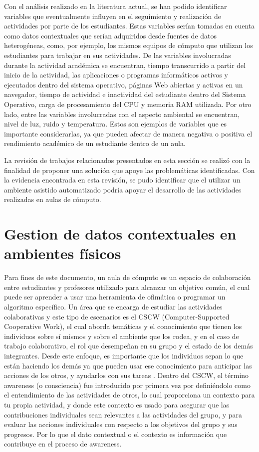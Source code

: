 Con el análisis realizado en la literatura actual, se han podido identificar variables que eventualmente influyen en el seguimiento y realización de actividades por parte de los estudiantes. Estas variables serían tomadas en cuenta como datos contextuales que serían adquiridos desde fuentes de datos heterogéneas, como, por ejemplo, los mismos equipos de cómputo que utilizan los estudiantes para trabajar en sus actividades. De las variables involucradas durante la actividad académica se encuentran, tiempo transcurrido a partir del inicio de la actividad, las aplicaciones o programas informáticos activos y ejecutados dentro del sistema operativo, páginas Web abiertas y activas en un navegador, tiempo de actividad e inactividad del estudiante dentro del Sistema Operativo, carga de procesamiento del CPU y memoria RAM utilizada. Por otro lado, entre las variables involucradas con el aspecto ambiental se encuentran, nivel de luz, ruido y temperatura. Estos son ejemplos de variables que es importante considerarlas, ya que pueden afectar de manera negativa o positiva el rendimiento académico de un estudiante dentro de un aula.

La revisión de trabajos relacionados presentados en esta sección se realizó con la finalidad de proponer una solución que apoye las problemáticas identificadas. Con la evidencia encontrada en esta revisión, se pudo identificar que el utilizar un ambiente asistido automatizado podría apoyar el desarrollo de las actividades realizadas en aulas de cómputo.


\section{Gestion de datos contextuales en ambientes físicos}
Para fines de este documento, un aula de cómputo es un espacio de colaboración entre estudiantes y profesores utilizado para alcanzar un objetivo común, el cual puede ser aprender a usar una herramienta de ofimática o programar un algoritmo específico. Un área que se encarga de estudiar las actividades colaborativas y este tipo de escenarios es el CSCW (Computer-Supported Cooperative Work), el cual aborda temáticas y el conocimiento que tienen los individuos sobre sí mismos y sobre el ambiente que los rodea, y en el caso de trabajo colaborativo, el rol que desempeñan en su grupo y el estado de los demás integrantes. Desde este enfoque, es importante que los individuos sepan lo que están haciendo los demás ya que pueden usar ese conocimiento para anticipar las acciones de los otros, y ayudarlos con sus tareas \citep{Gutwin1996}. Dentro del CSCW, el término awareness (o consciencia) fue introducido por primera vez por \citep{Dourish1992a} definiéndolo como el entendimiento de las actividades de otros, lo cual proporciona un contexto para tu propia actividad, y donde este contexto es usado para asegurar que las contribuciones individuales sean relevantes a las actividades del grupo, y para evaluar las acciones individuales con respecto a los objetivos del grupo y sus progresos. Por lo que el dato contextual o el contexto es información que contribuye en el proceso de awareness.


